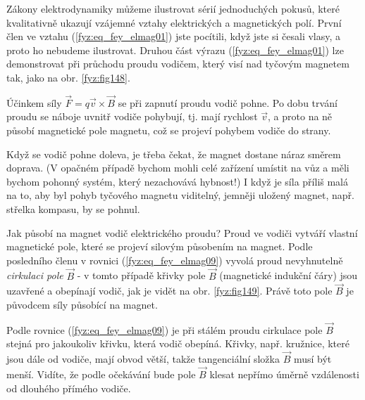     Zákony elektrodynamiky můžeme ilustrovat sérií jednoduchých pokusů, které kvalitativně ukazují 
    vzájemné vztahy elektrických a magnetických polí. První člen ve vztahu 
    (\ref{fyz:eq_fey_elmag01}) jste pocítili, když jste si česali vlasy, a proto ho nebudeme 
    ilustrovat. Druhou část výrazu (\ref{fyz:eq_fey_elmag01}) lze demonstrovat při průchodu proudu 
    vodičem, který visí nad tyčovým magnetem tak, jako na obr. \ref{fyz:fig148}.

    
    Účinkem síly \(\vec{F} = q\vec{v}\times\vec{B}\) se při zapnutí proudu vodič pohne. Po dobu 
    trvání proudu se náboje uvnitř vodiče pohybují, tj. mají rychlost \(\vec{v}\), a proto na ně 
    působí magnetické pole magnetu, což se projeví pohybem vodiče do strany.
    
    Když se vodič pohne doleva, je třeba čekat, že magnet dostane náraz směrem doprava. (V opačném 
    případě bychom mohli celé zařízení umístit na vůz a měli bychom pohonný systém, který 
    nezachovává hybnost!) I když je síla příliš malá na to, aby byl pohyb tyčového magnetu 
    viditelný, jemněji uložený magnet, např. střelka kompasu, by se pohnul.
    
    Jak působí na magnet vodič elektrického proudu? Proud ve vodiči vytváří vlastní magnetické 
    pole, které se projeví silovým působením na magnet. Podle posledního členu v rovnici 
    (\ref{fyz:eq_fey_elmag09}) vyvolá proud nevyhnutelně \emph{cirkulaci pole} \(\vec{B}\) - v 
    tomto případě křivky pole \(\vec{B}\) (magnetické indukční čáry) jsou uzavřené a obepínají 
    vodič, jak je vidět na obr. \ref{fyz:fig149}. Právě toto pole \(\vec{B}\) je původcem 
    síly působící na magnet.  
    
    Podle rovnice (\ref{fyz:eq_fey_elmag09}) je při stálém proudu cirkulace pole \(\vec{B}\) stejná 
    pro jakoukoliv křivku, která vodič obepíná. Křivky, např. kružnice, které jsou dále od vodiče, 
    mají obvod větší, takže tangenciální složka \(\vec{B}\) musí být menší. Vidíte, že podle 
    očekávání bude pole \(\vec{B}\) klesat nepřímo úměrně vzdálenosti od dlouhého přímého 
    vodiče.     

    
